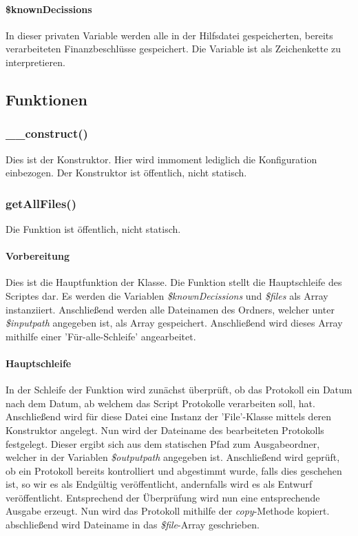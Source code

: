 \documentclass[12pt,parskip=full, pagea4]{scrreprt}
\begin{document}
	\paragraph{\$knownDecissions} In dieser privaten Variable werden alle in der Hilfsdatei gespeicherten, bereits verarbeiteten Finanzbeschlüsse gespeichert. Die Variable ist als Zeichenkette zu interpretieren.
	
	\subsection{Funktionen}
	\subsubsection{\_\_construct()} Dies ist der Konstruktor. Hier wird immoment lediglich die Konfiguration einbezogen. Der Konstruktor ist öffentlich, nicht statisch.
	
	\subsubsection{getAllFiles()} Die Funktion ist öffentlich, nicht statisch.
	\paragraph{Vorbereitung}Dies ist die Hauptfunktion der Klasse. Die Funktion stellt die Hauptschleife des Scriptes dar. Es werden die Variablen \textit{\$knownDecissions} und \textit{\$files} als Array instanziiert. Anschließend werden alle Dateinamen des Ordners, welcher unter \textit{\$inputpath} angegeben ist, als Array gespeichert. Anschließend wird dieses Array mithilfe einer 'Für-alle-Schleife' angearbeitet.
	\paragraph{Hauptschleife} In der Schleife der Funktion wird zunächst überprüft, ob das Protokoll ein Datum nach dem Datum, ab welchem das Script Protokolle verarbeiten soll, hat. Anschließend wird für diese Datei eine Instanz der 'File'-Klasse mittels deren Konstruktor angelegt. Nun wird der Dateiname des bearbeiteten Protokolls festgelegt. Dieser ergibt sich aus dem statischen Pfad zum Ausgabeordner, welcher in der Variablen \textit{\$outputpath} angegeben ist. Anschließend wird geprüft, ob ein Protokoll bereits kontrolliert und abgestimmt wurde, falls dies geschehen ist, so wir es als Endgültig veröffentlicht, andernfalls wird es als Entwurf veröffentlicht. Entsprechend der Überprüfung wird nun eine entsprechende Ausgabe erzeugt. Nun wird das Protokoll mithilfe der \textit{copy}-Methode kopiert. abschließend wird Dateiname in das \textit{\$file}-Array geschrieben.
\end{document}

